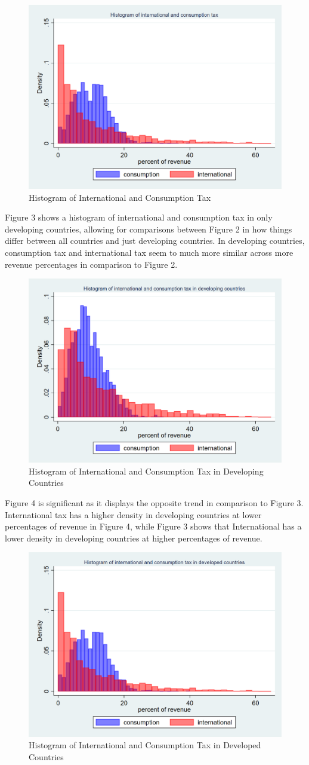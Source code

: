 \documentclass[12pt]{article}
\begin{document}
\begin{figure}[h]
    \centering
    \includegraphics[width=0.5\linewidth]{Reproducibility_Package//png_files/twowayhistintcons.png}
    \caption{Histogram of International and Consumption Tax}
    \label{fig:enter-label}
\end{figure}

Figure 3 shows a histogram of international and consumption tax in only developing countries, allowing for comparisons between Figure 2 in how things differ between all countries and just developing countries. In developing countries, consumption tax and international tax seem to much more similar across more revenue percentages in comparison to Figure 2. 

\begin{figure}[h]
    \centering
    \includegraphics[width=0.5\linewidth]{Reproducibility_Package//png_files/twowayhistdevelopingintcons.png}
    \caption{Histogram of International and Consumption Tax in Developing Countries}
    \label{fig:enter-label}
\end{figure}

Figure 4 is significant as it displays the opposite trend in comparison to Figure 3. International tax has a higher density in developing countries at lower percentages of revenue in Figure 4, while Figure 3 shows that International has a lower density in developing countries at higher percentages of revenue. 

\begin{figure}[h]
    \centering
    \includegraphics[width=0.5\linewidth]{Reproducibility_Package//png_files/twowayhistdevelopedintcons.png}
    \caption{Histogram of International and Consumption Tax in Developed Countries}
    \label{fig:enter-label}
\end{figure}
\end{document}
